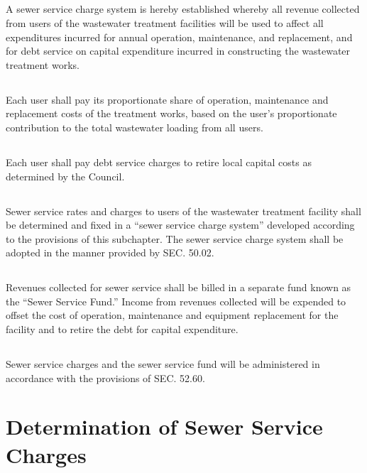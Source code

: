 \subsection{}
A sewer service charge system is hereby established whereby all revenue collected from users of the wastewater treatment facilities will be used to affect all expenditures incurred for annual operation, maintenance, and replacement, and for debt service on capital expenditure incurred in constructing the wastewater treatment works.
\subsection{}
Each user shall pay its proportionate share of operation, maintenance and replacement costs of the treatment works, based on the user’s proportionate contribution to the total wastewater loading from all users.
\subsection{}
Each user shall pay debt service charges to retire local capital costs as determined by the Council.
\subsection{}
Sewer service rates and charges to users of the wastewater treatment facility shall be determined and fixed in a “sewer service charge system” developed according to the provisions of this subchapter. The sewer service charge system shall be adopted in the manner provided by SEC. 50.02.
\subsection{}
Revenues collected for sewer service shall be billed in a separate fund known as the “Sewer Service Fund.” Income from revenues collected will be expended to offset the cost of operation, maintenance and equipment replacement for the facility and to retire the debt for capital expenditure.
\subsection{}
Sewer service charges and the sewer service fund will be administered in accordance with the provisions of SEC. 52.60.

\section{Determination of Sewer Service Charges}
